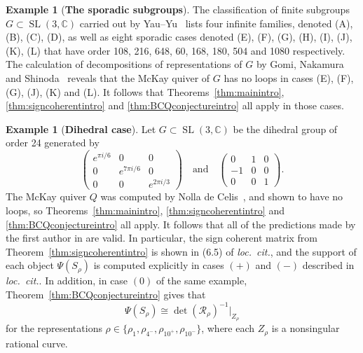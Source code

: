 \documentclass[11pt,reqno]{amsart}
\numberwithin{equation}{section}
\theoremstyle{definition}
\newtheorem{example}[theorem]{Example}
\newcommand{\CC}{\ensuremath{\mathbb{C}}}
\newcommand{\0}{\operatorname{0}}
\newcommand{\SL}{\operatorname{SL}}
\begin{document}
\begin{example}[\textbf{The  sporadic subgroups}]
 The classification of finite subgroups $G\subset \SL(3,\mathbb{C})$ carried out by Yau--Yu~\cite{YauYu93} lists four infinite families, denoted (A), (B), (C), (D), as well as eight sporadic cases denoted (E), (F), (G), (H), (I), (J), (K), (L) that have order 108, 216, 648, 60, 168, 180, 504 and 1080 respectively. The calculation of decompositions of representations of $G$ by Gomi, Nakamura and Shinoda~\cite[Appendix]{GNS04} reveals that the McKay quiver of $G$ has no loops in cases (E), (F), (G), (J), (K) and (L). It follows that Theorems~\ref{thm:mainintro}, \ref{thm:signcoherentintro} and \ref{thm:BCQconjectureintro} all apply in those cases. 
\end{example}


 \begin{example}[\textbf{Dihedral case}]
 \label{exa:BentoBox}
 Let $G\subset \SL(3,\CC)$ be the dihedral group of order 24 generated by 
 \[
 \begin{pmatrix} e^{\pi i/6} & 0 & 0 \\ 
 0 & e^{7\pi i/6} & 0 \\ 0 & 0 & e^{2\pi i/3} \end{pmatrix}\quad\text{and}\quad
  \begin{pmatrix} 
 0 & 1 & 0 \\ 
 -1 & 0 & 0 \\ 
 0 & 0 & 1
 \end{pmatrix}.
 \]
  The McKay quiver $Q$ was computed by  
 Nolla de Celis~\cite[Figure~5]{NolladeCelis21}, and shown to have no loops, so Theorems~\ref{thm:mainintro}, \ref{thm:signcoherentintro} and \ref{thm:BCQconjectureintro} all apply. It follows that all of the predictions made by the first author in \cite[Example~6.5]{C21} are valid. In particular, the sign coherent matrix from Theorem~\ref{thm:signcoherentintro} is shown in (6.5) of \emph{loc.~cit.}, and the support of each object $\Psi(S_\rho)$ is computed explicitly in cases $(+)$ and $(-)$ described in \emph{loc.~cit.}. In addition, in case $(0)$ of the same example,  Theorem~\ref{thm:BCQconjectureintro} gives that 
 \[
 \Psi(S_\rho)\cong \det(\mathcal{R}_\rho)^{-1}\vert_{Z_\rho}
 \]
 for the representations $\rho\in \{\rho_1, \rho_{4^-}, \rho_{10^+}, \rho_{10^-}\}$, where each $Z_\rho$ is a nonsingular rational curve. 
  \end{example}
\end{document}
